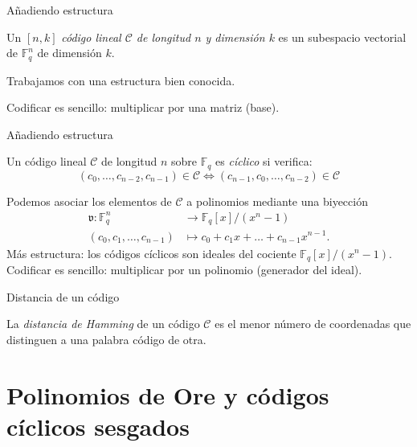 \documentclass[spanish,aspectratio=169]{beamer}
\begin{document}
\begin{frame}{Añadiendo estructura}
  \begin{definition}
    Un \([n, k]\) \emph{código lineal \(\mathcal C\) de longitud \(n\) y dimensión \(k\)} es un \alert<2,3>{subespacio vectorial} de \(\mathbb F_q^n\) de dimensión \(k\).
  \end{definition}
  
  \pause
  
  \textcolor{green}{\faCheckCircle} Trabajamos con una estructura bien conocida.
  
  \pause
  
  \textcolor{green}{\faCheckCircle} Codificar es sencillo: multiplicar por una matriz (base).
\end{frame}

\begin{frame}{Añadiendo estructura}
  \begin{definition}
    Un código lineal \(\mathcal C\) de longitud \(n\) sobre \(\mathbb F_q\) es \textit{cíclico} si verifica:
    \[(c_0, \dots, c_{n-2}, c_{n-1}) \in \mathcal C \iff (c_{n-1}, c_0, \dots, c_{n-2}) \in \mathcal C\]
  \end{definition}
  
  \pause
  
  Podemos \alert<3,4>{asociar los elementos de \(\mathcal C\) a polinomios} mediante una biyección
  \begin{align*}
    \mathfrak v: \mathbb F_q^n &\to \mathbb F_q[x]/(x^n - 1)\\
    (c_0, c_1, \dots, c_{n-1}) &\mapsto c_0 + c_1x + \dots + c_{n-1}x^{n-1}.
  \end{align*}
  \pause
  \textcolor{green}{\faCheckCircle} Más estructura: los códigos cíclicos son ideales del cociente \(\mathbb F_q[x]/(x^n - 1)\).
  \pause
  \textcolor{green}{\faCheckCircle} Codificar es sencillo: multiplicar por un polinomio (generador del ideal).
\end{frame}

\begin{frame}{Distancia de un código}
  \begin{definition}
    La \emph{distancia de Hamming} de un código \(\mathcal C\) es el menor número de coordenadas que distinguen a una palabra código de otra.
  \end{definition}
\end{frame}

\section{Polinomios de Ore y códigos cíclicos sesgados}
\end{document}

